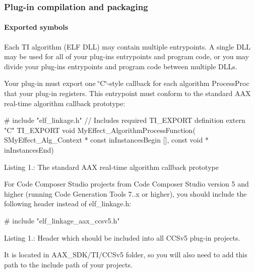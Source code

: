 \hypertarget{a00362_subsection__plugin_compilation_and_packaging}{}\subsubsection{Plug-\/in compilation and packaging}\label{a00362_subsection__plugin_compilation_and_packaging}
 \hypertarget{a00362_subsubsection__exported_symbols_}{}\paragraph{Exported symbols}\label{a00362_subsubsection__exported_symbols_}
 Each T\+I algorithm (E\+L\+F D\+L\+L) may contain multiple entrypoints. A single D\+L\+L may be used for all of your plug-\/in\textquotesingle{}s entrypoints and program code, or you may divide your plug-\/in\textquotesingle{}s entrypoints and program code between multiple D\+L\+Ls.

Your plug-\/in must export one \char`\"{}\+C\char`\"{}-\/style callback for each algorithm Process\+Proc that your plug-\/in registers. This entrypoint must conform to the standard A\+A\+X real-\/time algorithm callback prototype\+:


\begin{DoxyCode}
\textcolor{preprocessor}{# include "elf\_linkage.h"} \textcolor{comment}{// Includes required TI\_EXPORT definition}
\textcolor{keyword}{extern} \textcolor{stringliteral}{"C"}
TI\_EXPORT
\textcolor{keywordtype}{void}
MyEffect\_AlgorithmProcessFunction(
    SMyEffect\_Alg\_Context * \textcolor{keyword}{const}  inInstancesBegin  [],
    \textcolor{keyword}{const} \textcolor{keywordtype}{void} *    inInstancesEnd)
\end{DoxyCode}
  Listing 1.\+: The standard A\+A\+X real-\/time algorithm callback prototype

For Code Composer Studio projects from Code Composer Studio version 5 and higher (running Code Generation Tools 7..\+x or higher), you should include the following header instead of elf\+\_\+linkage.\+h\+:


\begin{DoxyCode}
\textcolor{preprocessor}{# include "elf\_linkage\_aax\_ccsv5.h"}
\end{DoxyCode}
  Listing 1.\+: Header which should be included into all C\+C\+Sv5 plug-\/in projects.

It is located in A\+A\+X\+\_\+\+S\+D\+K/\+T\+I/\+C\+C\+Sv5 folder, so you will also need to add this path to the include path of your projects.


